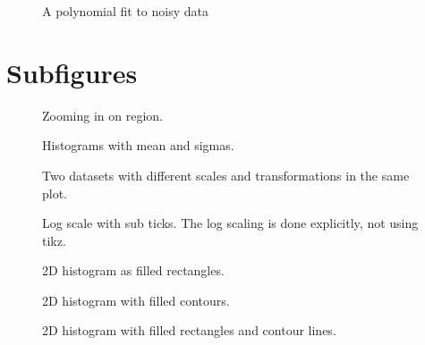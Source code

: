 \documentclass{article}
\begin{document}
\begin{figure}[H]
  \centering
  
  \caption{A polynomial fit to noisy data}
\end{figure}

\section{Subfigures}
\label{sec:subfig}

\begin{figure}[H]
  \centering
  
  \caption{ Zooming in on region. }
\end{figure}

\begin{figure}[H]
  \centering
  
  \caption{ Histograms with mean and sigmas.}
\end{figure}

\begin{figure}[H]
  \centering
  
  \caption{ Two datasets with different scales and transformations in the same plot.}
\end{figure}

\begin{figure}[H]
  \centering
  
  \caption{ Log scale with sub ticks. The log scaling is done explicitly, not using tikz.}
\end{figure}

\begin{figure}[H]
  \centering
  
  \caption{ 2D histogram as filled rectangles.}
\end{figure}

\begin{figure}[H]
  \centering
  
  \caption{ 2D histogram with filled contours.}
\end{figure}

\begin{figure}[H]
  \centering
  
  \caption{ 2D histogram  with filled rectangles and contour lines.}
\end{figure}
\end{document}
